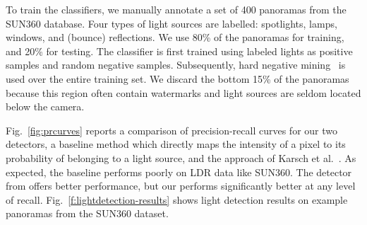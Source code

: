 To train the classifiers, we manually annotate a set of 400 panoramas from the SUN360 database. Four types of light sources are labelled: spotlights, lamps, windows, and (bounce) reflections. We use 80\% of the panoramas for training, and 20\% for testing. The classifier is first trained using labeled lights as positive samples and random negative samples. Subsequently, hard negative mining~\cite{felzenszwalb-pami-10} is used over the entire training set. We discard the bottom 15\% of the panoramas because this region often contain watermarks and light sources are seldom located below the camera. 

Fig.~\ref{fig:prcurves} reports a comparison of precision-recall curves for our two detectors, a baseline method which directly maps the intensity of a pixel to its probability of belonging to a light source, and the approach of Karsch et al.~. As expected, the baseline performs poorly on LDR data like SUN360. The detector from \cite{karsch-tog-14} offers better performance, but our performs significantly better at any level of recall. Fig.~\ref{f:lightdetection-results} shows light detection results on example panoramas from the SUN360 dataset. 









